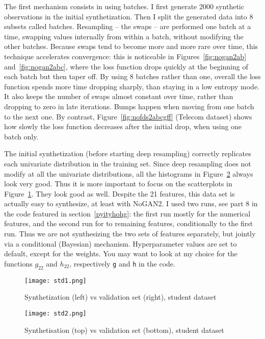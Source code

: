 \documentclass[oneside,10pt]{book}
\begin{document}
The first mechanism consists in using \textcolor{index}{batches}. I first generate 2000 synthetic observations
in the initial synthetization. Then I split the generated data into 8 subsets called batches. Resampling -- the swaps -- are performed one batch at a time,
 swapping values internally from within a batch, without modifying the other batches. Because swaps tend to become more and more rare over time,
 this technique accelerates convergence: this is noticeable in Figures~\ref{fig:nogan2ab} and~\ref{fig:nogan2abc}, where the loss function drops quickly at the beginning of each batch but then taper off. By using 8 batches rather than one, overall the loss function spends more time dropping sharply, than staying in a low entropy mode. It also keeps the number of swaps almost constant over time, rather than dropping to zero in late iterations. Bumps happen when moving from one batch to the next one. By contrast, Figure~\ref{fig:nofds2abcgff} (Telecom dataset) shows how slowly the loss function decreases after the initial drop, when using one batch only.

The initial synthetization (before starting deep resampling) correctly replicates each univariate distribution in the training set. Since deep resampling
 does not modify at all the univariate distributions, all the histograms in Figure~\ref{fig:rt4nogan2abc} always look very good.
 Thus it is more important to focus on the scatterplots in Figure~\ref{fig:rt3nogan2abc}. They look good as well. Despite the 21 features, this data set is actually easy to synthesize, at least with NoGAN2. I used two runs, see part 8 in the code featured in section~\ref{pyityhohg}: the first run mostly for
 the numerical features, and the second run for to remaining features, conditionally to the first run. Thus we are not synthesizing the two sets of features
 separately, but jointly via a conditional (Bayesian) mechanism.
 Hyperparameter values are set to default, except for the weights. You may want to look at my choice for
 the functions $g_{22}$ and $h_{22}$, respectively \texttt{g} and \texttt{h} in the code.

\begin{figure}[H]
\centering
\texttt{[image: std1.png]} %
\caption{Synthetization (left) vs validation set (right), student dataset}
\label{fig:rt3nogan2abc}
\end{figure}

\begin{figure}[H]
\centering
\texttt{[image: std2.png]} %
\caption{Synthetisation (top) vs validation set (bottom), student dataset}
\label{fig:rt4nogan2abc}
\end{figure}
\end{document}
